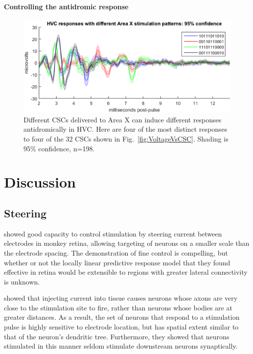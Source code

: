 \documentclass[10pt,letterpaper]{article}
\newcommand\fig[1]{Fig.~\ref{#1}}
\renewcommand{\subsubsection}[1]{\paragraph{#1}}
\begin{document}
\subsubsection{Controlling the antidromic response}

\begin{figure}
  \includegraphics[width=\textwidth]{HVCresponseVsCSC}
  \caption{Different CSCs delivered to Area X can induce different responses antidromically in HVC.  Here are four of the most distinct responses to four of the 32 CSCs shown in \fig{fig:VoltageVsCSC}.  Shading is 95\% confidence, n=198.}
  \label{fig:HVCresponseVsCSC}
\end{figure}


\section{Discussion}

\subsection{Steering}

\cite{Jepson2014steering_in_retina} showed good capacity to control stimulation by steering current between electrodes in monkey retina, allowing targeting of neurons on a smaller scale than the electrode spacing.  The demonstration of fine control is compelling, but whether or not the locally linear predictive response model that they found effective in retina would be extensible to regions with greater lateral connectivity is unknown.

\cite{Histed2009stimulation} showed that injecting current into tissue causes neurons whose axons are very close to the stimulation site to fire, rather than neurons whose bodies are at greater distances.  As a result, the set of neurons that respond to a stimulation pulse is highly sensitive to electrode location, but has spatial extent similar to that of the neuron's dendritic tree.  Furthermore, they showed that neurons stimulated in this manner seldom stimulate downstream neurons synaptically.
\end{document}
